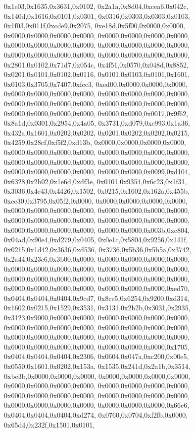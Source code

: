 {	0x1e03,0x1635,0x3631,0x0102,
	0x2a1a,0x8d04,0xcea6,0x042c,
	0x140d,0x1616,0x0101,0x0301,
	0x0316,0x0303,0x0303,0x0103,
	0x1f03,0x011f,0xcde9,0x2075,
	0xe18d,0x5f00,0x0000,0x0000,
	0x0000,0x0000,0x0000,0x0000,
	0x0000,0x0000,0x0000,0x0000,
	0x0000,0x0000,0x0000,0x0000,
	0x0000,0x0000,0x0000,0x0000,
	0x0000,0x0000,0x0000,0x0000,
	0x0000,0x0000,0x0000,0x0000,
	0x2801,0x0102,0x71d7,0x054c,
	0x4f51,0x0570,0x048d,0x8852,
	0x0201,0x0101,0x0102,0x0116,
	0x0101,0x0103,0x0101,0x1601,
	0x0103,0x3705,0x7407,0xfcc3,
	0xed00,0x0000,0x0000,0x0000,
	0x0000,0x0000,0x0000,0x0000,
	0x0000,0x0000,0x0000,0x0000,
	0x0000,0x0000,0x0000,0x0000,
	0x0000,0x0000,0x0000,0x0000,
	0x0000,0x0000,0x0000,0x0000,
	0x0000,0x0000,0x0017,0x9f62,
	0x8a1d,0x0301,0x2954,0x4a05,
	0x3731,0xd079,0xc993,0x1a36,
	0x432a,0x1601,0x0202,0x0202,
	0x0201,0x0202,0x0202,0x0215,
	0x4259,0x28cf,0xf5f2,0xd13b,
	0x0000,0x0000,0x0000,0x0000,
	0x0000,0x0000,0x0000,0x0000,
	0x0000,0x0000,0x0000,0x0000,
	0x0000,0x0000,0x0000,0x0000,
	0x0000,0x0000,0x0000,0x0000,
	0x0000,0x0000,0x0000,0x0000,
	0x0000,0x0000,0x0099,0xd104,
	0x6328,0x2b02,0x1e6d,0xdf3e,
	0x0101,0x9354,0x6c23,0x1f31,
	0x3036,0x4e43,0x4426,0x1502,
	0x0215,0x1602,0x162a,0x455b,
	0xec30,0x3795,0x05f2,0x0000,
	0x0000,0x0000,0x0000,0x0000,
	0x0000,0x0000,0x0000,0x0000,
	0x0000,0x0000,0x0000,0x0000,
	0x0000,0x0000,0x0000,0x0000,
	0x0000,0x0000,0x0000,0x0000,
	0x0000,0x0000,0x0000,0x0000,
	0x0000,0x0000,0x003b,0xc804,
	0x04ad,0x90e4,0xd279,0x0405,
	0x0e1c,0x5804,0x9256,0x141f,
	0x0215,0x1d42,0x3636,0xd536,
	0x3736,0x5b36,0x5b5a,0x3742,
	0x2a44,0x23c6,0x3b00,0x0000,
	0x0000,0x0000,0x0000,0x0000,
	0x0000,0x0000,0x0000,0x0000,
	0x0000,0x0000,0x0000,0x0000,
	0x0000,0x0000,0x0000,0x0000,
	0x0000,0x0000,0x0000,0x0000,
	0x0000,0x0000,0x0000,0x0000,
	0x0000,0x0000,0x0000,0xed70,
	0x0404,0x0404,0x0404,0x9cd7,
	0x8ce5,0x6254,0x9200,0xd314,
	0x1602,0x0215,0x1529,0x3531,
	0x3131,0x2b2b,0x3031,0x2935,
	0x3123,0x9000,0x0000,0x0000,
	0x0000,0x0000,0x0000,0x0000,
	0x0000,0x0000,0x0000,0x0000,
	0x0000,0x0000,0x0000,0x0000,
	0x0000,0x0000,0x0000,0x0000,
	0x0000,0x0000,0x0000,0x0000,
	0x0000,0x0000,0x0000,0x0000,
	0x0000,0x0000,0x0000,0x1705,
	0x0404,0x0404,0x0404,0x2306,
	0x0604,0x047a,0xc200,0x00e5,
	0x0550,0x1601,0x0202,0x153a,
	0x1535,0x241d,0x2a1b,0x3514,
	0xbc3b,0x0000,0x0000,0x0000,
	0x0000,0x0000,0x0000,0x0000,
	0x0000,0x0000,0x0000,0x0000,
	0x0000,0x0000,0x0000,0x0000,
	0x0000,0x0000,0x0000,0x0000,
	0x0000,0x0000,0x0000,0x0000,
	0x0000,0x0000,0x0000,0x0000,
	0x0000,0x0000,0x0000,0x66c6,
	0x0404,0x0404,0x0404,0xd274,
	0x0760,0x0704,0xf2fb,0x0000,
	0x65d4,0x232f,0x1501,0x0101,
}
